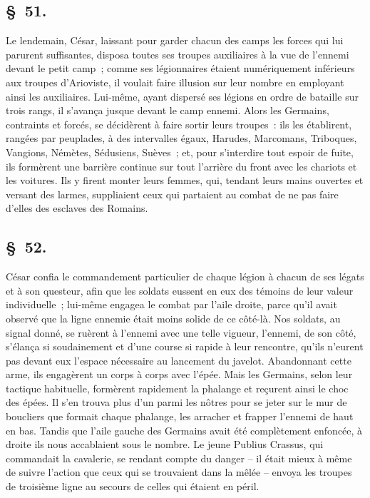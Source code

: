 \documentclass[french,twoside]{book} %
\begin{document}
\subsection[{§ 51.}]{ \textsc{§ 51.} }
\noindent Le lendemain, César, laissant pour garder chacun des camps les forces qui lui parurent suffisantes, disposa toutes ses troupes auxiliaires à la vue de l’ennemi devant le petit camp ; comme ses légionnaires étaient numériquement inférieurs aux troupes d’Arioviste, il voulait faire illusion sur leur nombre en employant ainsi les auxiliaires. Lui-même, ayant dispersé ses légions en ordre de bataille sur trois rangs, il s’avança jusque devant le camp ennemi. Alors les Germains, contraints et forcés, se décidèrent à faire sortir leurs troupes : ils les établirent, rangées par peuplades, à des intervalles égaux, Harudes, Marcomans, Triboques, Vangions, Némètes, Sédusiens, Suèves ; et, pour s’interdire tout espoir de fuite, ils formèrent une barrière continue sur tout l’arrière du front avec les chariots et les voitures. Ils y firent monter leurs femmes, qui, tendant leurs mains ouvertes et versant des larmes, suppliaient ceux qui partaient au combat de ne pas faire d’elles des esclaves des Romains.
\subsection[{§ 52.}]{ \textsc{§ 52.} }
\noindent César confia le commandement particulier de chaque légion à chacun de ses légats et à son questeur, afin que les soldats eussent en eux des témoins de leur valeur individuelle ; lui-même engagea le combat par l’aile droite, parce qu’il avait observé que la ligne ennemie était moins solide de ce côté-là. Nos soldats, au signal donné, se ruèrent à l’ennemi avec une telle vigueur, l’ennemi, de son côté, s’élança si soudainement et d’une course si rapide à leur rencontre, qu’ils n’eurent pas devant eux l’espace nécessaire au lancement du javelot. Abandonnant cette arme, ils engagèrent un corps à corps avec l’épée. Mais les Germains, selon leur tactique habituelle, formèrent rapidement la phalange et reçurent ainsi le choc des épées. Il s’en trouva plus d’un parmi les nôtres pour se jeter sur le mur de boucliers que formait chaque phalange, les arracher et frapper l’ennemi de haut en bas. Tandis que l’aile gauche des Germains avait été complètement enfoncée, à droite ils nous accablaient sous le nombre. Le jeune Publius Crassus, qui commandait la cavalerie, se rendant compte du danger – il était mieux à même de suivre l’action que ceux qui se trouvaient dans la mêlée – envoya les troupes de troisième ligne au secours de celles qui étaient en péril.
\end{document}
